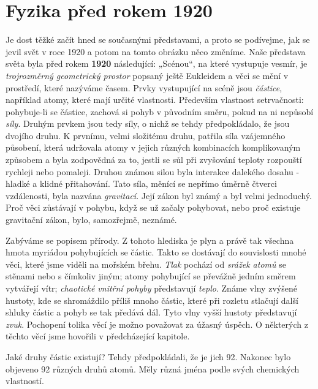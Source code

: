   \section{Fyzika před rokem 1920}\label{fyz:IchapIsecIV}
    Je dost těžké začít hned se současnými představami, a proto se podívejme, jak se jevil svět v 
    roce 1920 a potom na tomto obrázku něco změníme. Naše představa světa byla před rokem 
    \textbf{1920} následující: „Scénou“, na které vystupuje vesmír, je \emph{trojrozměrný 
    geometrický prostor} popsaný ještě Eukleidem a věci se mění v prostředí, které nazýváme časem. 
    Prvky vystupující na scéně jsou \emph{částice}, například atomy, které mají určité vlastnosti. 
    Především vlastnost setrvačnosti: pohybuje-li se částice, zachová si pohyb v původním směru, 
    pokud na ni nepůsobí \emph{síly}. Druhým prvkem jsou tedy síly, o nichž se tehdy  
    předpokládalo, že jsou dvojího druhu. K prvnímu, velmi složitému druhu, patřila síla vzájemného 
    působení, která udržovala atomy v jejich různých kombinacích komplikovaným způsobem a byla 
    zodpovědná za to, jestli se sůl při zvyšování teploty rozpouští rychleji nebo pomaleji. Druhou 
    známou silou byla interakce dalekého dosahu - hladké a klidné přitahování. Tato síla, měnící se 
    nepřímo úměrně čtverci vzdálenosti, byla nazvána \emph{gravitací}. Její zákon byl známý a byl 
    velmi jednoduchý. Proč věci zůstávají v pohybu, když se už začaly pohybovat, nebo proč existuje 
    gravitační zákon, bylo, samozřejmě, neznámé.
    
    Zabýváme se popisem přírody. Z tohoto hlediska je plyn a právě tak všechna hmota myriádou 
    pohybujících se částic. Takto se dostávají do souvislosti mnohé věci, které jsme viděli na 
    mořském břehu. \emph{Tlak} pochází od \emph{srážek atomů} se stěnami nebo s čímkoliv jiným; 
    atomy pohybující se převážně jedním směrem vytvářejí vítr; \emph{chaotické vnitřní pohyby} 
    představují \emph{teplo}. Známe vlny zvýšené hustoty, kde se shromáždilo příliš mnoho částic, 
    které při rozletu stlačují další shluky částic a pohyb se tak předává dál. Tyto vlny vyšší 
    hustoty představují \emph{zvuk}. Pochopení tolika věcí je možno považovat za úžasný úspěch. O 
    některých z těchto věcí jsme hovořili v předcházející kapitole.
    
    Jaké druhy částic existují? Tehdy předpokládali, že je jich 92. Nakonec bylo objeveno 92 
    různých druhů atomů. Měly různá jména podle svých chemických vlastností.
    
